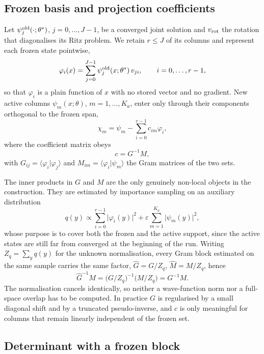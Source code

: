 \documentclass[10pt,a4paper]{article}
\newcommand{\braket}[2]{\langle #1\vert #2\rangle}
\begin{document}
\subsection{Frozen basis and projection coefficients}

Let $\psi_j^{\rm old}(\cdot;\theta^*)$, $j=0,\dots,J-1$, be a converged joint solution and $v_{\rm rot}$ the rotation that diagonalises its Ritz problem. We retain $r\le J$ of its columns and represent each frozen state pointwise,
\begin{equation}
\varphi_i(x)=\sum_{j=0}^{J-1}\psi_j^{\rm old}(x;\theta^*)\,v_{ji},
\qquad i=0,\dots,r-1,
\end{equation}
so that $\varphi_i$ is a plain function of $x$ with no stored vector and no gradient. New active columns $\psi_m(x;\theta)$, $m=1,\dots,K_a$, enter only through their components orthogonal to the frozen span,
\begin{equation}
\chi_m=\psi_m-\sum_{i=0}^{r-1}c_{im}\varphi_i,
\end{equation}
where the coefficient matrix obeys
\begin{equation}
c=G^{-1}M,
\end{equation}
with $G_{ij}=\braket{\varphi_i}{\varphi_j}$ and $M_{im}=\braket{\varphi_i}{\psi_m}$ the Gram matrices of the two sets.

The inner products in $G$ and $M$ are the only genuinely non-local objects in the construction. They are estimated by importance sampling on an auxiliary distribution
\begin{equation}
q(y)\propto\sum_{i=0}^{r-1}\lvert\varphi_i(y)\rvert^2
+\varepsilon\sum_{m=1}^{K_a}\lvert\psi_m(y)\rvert^2 ,
\end{equation}
whose purpose is to cover both the frozen and the active support, since the active states are still far from converged at the beginning of the run. Writing $Z_q=\sum_y q(y)$ for the unknown normalisation, every Gram block estimated on the same sample carries the same factor, $\hat G=G/Z_q$, $\hat M=M/Z_q$, hence
\begin{equation}
\hat G^{-1}\hat M=\bigl(G/Z_q\bigr)^{-1}\bigl(M/Z_q\bigr)=G^{-1}M .
\end{equation}
The normalisation cancels identically, so neither a wave-function norm nor a full-space overlap has to be computed. In practice $G$ is regularised by a small diagonal shift and by a truncated pseudo-inverse, and $c$ is only meaningful for columns that remain linearly independent of the frozen set.

\subsection{Determinant with a frozen block}
\end{document}
